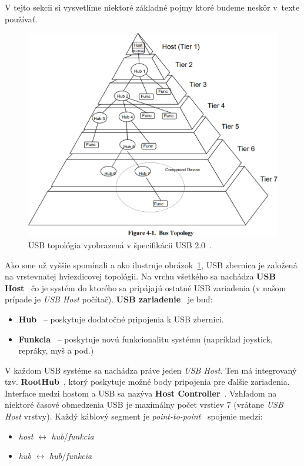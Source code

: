 V tejto sekcii si vysvetlíme niektoré základné pojmy ktoré budeme neskôr v~texte používať.

\begin{figure}[!htb]
	\centering
	\includegraphics[width=\textwidth]{img/uvod_usb_topology}
	\caption{USB topológia vyobrazená v špecifikácii USB 2.0~\cite{usb_topology}.}
	\label{obr:uvod:usb_topology}
\end{figure}

Ako sme už vyššie spomínali a ako ilustruje obrázok~\ref{obr:uvod:usb_topology}, USB zbernica je založená na vrstevnatej hviezdicovej topológii. Na vrchu všetkého sa nachádza \textbf{USB Host}~\cite{usb_host} čo je systém do ktorého sa pripájajú ostatné USB zariadenia (v našom prípade je \textit{USB Host} počítač). \textbf{USB zariadenie}~\cite{usb_device} je buď:
\begin{itemize}
\item \textbf{Hub}~\cite{usb_hub} -- poskytuje dodatočné pripojenia k USB zbernici.
\item \textbf{Funkcia}~\cite{usb_function} -- poskytuje novú funkcionalitu systému (napríklad joystick, repráky, myš a pod.)
\end{itemize}

 V každom USB systéme sa nachádza práve jeden \textit{USB Host}. Ten má integrovaný tzv. \textbf{RootHub}~\cite{usb_host}, ktorý poskytuje možné body pripojenia pre ďalšie zariadenia. Interface medzi hostom a USB sa nazýva \textbf{Host Controller}~\cite{usb_host}. Vzhľadom na niektoré časové obmedzenia USB je maximálny počet vrstiev 7 (vrátane \textit{USB Host} vrstvy). Každý káblový segment je \textit{point-to-point}~\cite{usb_bus_topology} spojenie medzi:
\begin{itemize}
\item \textit{host} $\longleftrightarrow$ \textit{hub}/\textit{funkcia}
\item \textit{hub} $\longleftrightarrow$ \textit{hub}/\textit{funkcia}
\end{itemize}

